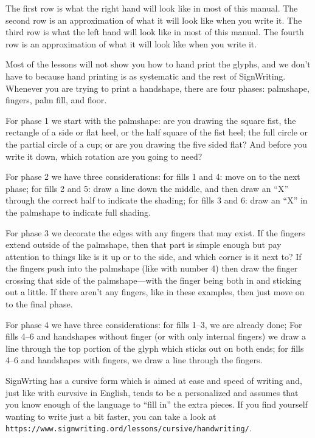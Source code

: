 \documentclass{article}
\begin{document}
The first row is what the right hand will look like in most of this manual.
The second row is an approximation of what it will look like when you write it.
The third row is what the left hand will look like in most of this manual.
The fourth row is an approximation of what it will look like when you write it.

Most of the lessons will not show you how to hand print the glyphs, and we don't have to because hand printing is as systematic and the rest of SignWriting.
Whenever you are trying to print a handshape, there are four phases: palmshape, fingers, palm fill, and floor.

For phase 1 we start with the palmshape:
are you drawing the square fist, the rectangle of a side or flat heel, or the half square of the fist heel;
the full circle or the partial circle of a cup;
or are you drawing the five sided flat?
And before you write it down, which rotation are you going to need?

For phase 2 we have three considerations:
for fills 1 and 4: move on to the next phase;
for fills 2 and 5: draw a line down the middle, and then draw an ``X'' through the correct half to indicate the shading;
for fills 3 and 6: draw an ``X'' in the palmshape to indicate full shading.

For phase 3 we decorate the edges with any fingers that may exist.
If the fingers extend outside of the palmshape, then that part is simple enough but pay attention to things like is it up or to the side, and which corner is it next to?
If the fingers push into the palmshape (like with number 4) then draw the finger crossing that side of the palmshape---with the finger being both in and sticking out a little.
If there aren't any fingers, like in these examples, then just move on to the final phase.

For phase 4 we have three considerations:
for fills 1--3, we are already done;
For fills 4--6 and handshapes without finger (or with only internal fingers) we draw a line through the top portion of the glyph which sticks out on both ends;
for fills 4--6 and handshapes with fingers, we draw a line through the fingers.

SignWrting has a cursive form which is aimed at ease and speed of writing and, just like with curvsive in English, tends to be a personalized and assumes that you know enough of the language to ``fill in'' the extra pieces.
If you find yourself wanting to write just a bit faster, you can take a look at \texttt{https://www.signwriting.ord/lessons/cursive/handwriting/}.
\end{document}

